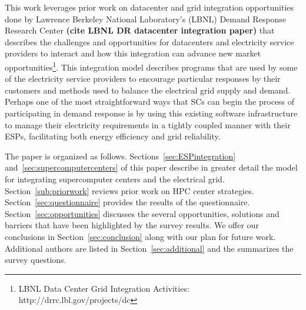 This work leverages prior work on datacenter and grid integration opportunities
done by Lawrence Berkeley National Laboratory's (LBNL) Demand Response 
Research Center \textbf{(cite LBNL DR datacenter integration paper)}
that describes the challenges and opportunities for datacenters and electricity
service providers to interact and how this integration can advance 
new market 
opportunities\footnote{LBNL Data Center Grid Integration Activities: http://drrc.lbl.gov/projects/dc}.
This integration model describes programs that are used by some of the electricity 
service providers to encourage particular responses by their customers and methods 
used to balance the electrical grid supply and demand.
Perhaps one of the most straightforward ways that SCs can begin
the process of participating in demand response is by using this existing software 
infrastructure to manage their electricity requirements in a tightly coupled manner 
with their ESPs, facilitating both energy efficiency and grid reliability.

The paper is organized as follows.
Sections~\ref{sec:ESPintegration} and~\ref{sec:supercomputercenters} of this paper
describe in greater detail the model for 
integrating supercomputer centers and the electrical grid.
Section~\ref{sub:priorwork}
reviews prior work on HPC center strategies. Section~\ref{sec:questionnaire}
provides the results of the questionnaire. 
Section~\ref{sec:opportunities} 
discusses the several opportunities, solutions and barriers that have been highlighted
by the survey results. We offer our conclusions in Section~\ref{sec:conclusion} along with our plan for future work.  Additional authors are listed in Section~\ref{sec:additional} and
the  summarizes the survey questions.
